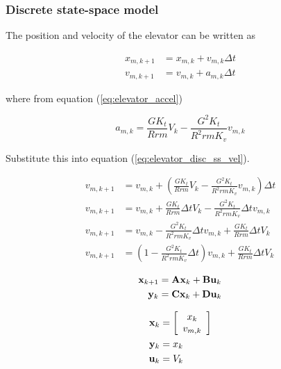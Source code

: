 \subsubsection{Discrete state-space model}

The position and velocity of the elevator can be written as

\begin{align}
  x_{m,k+1} &= x_{m,k} + v_{m,k} \Delta t \label{eq:elevator_disc_ss_pos} \\
  v_{m,k+1} &= v_{m,k} + a_{m,k} \Delta t \label{eq:elevator_disc_ss_vel}
\end{align}

where from equation (\ref{eq:elevator_accel})

\begin{equation*}
  a_{m,k} = \frac{GK_t}{Rrm} V_k - \frac{G^2 K_t}{R^2 rm K_v} v_{m,k}
\end{equation*}

Substitute this into equation (\ref{eq:elevator_disc_ss_vel}).

\begin{align}
  v_{m,k+1} &= v_{m,k} + \left(\frac{GK_t}{Rrm} V_k -
    \frac{G^2 K_t}{R^2 rm K_v} v_{m,k}\right) \Delta t \nonumber \\
  v_{m,k+1} &= v_{m,k} + \frac{GK_t}{Rrm} \Delta t V_k -
    \frac{G^2 K_t}{R^2 rm K_v} \Delta t v_{m,k} \nonumber \\
  v_{m,k+1} &= v_{m,k} - \frac{G^2 K_t}{R^2 rm K_v} \Delta t v_{m,k} +
    \frac{GK_t}{Rrm} \Delta t V_k \nonumber \\
  v_{m,k+1} &= \left(1 - \frac{G^2 K_t}{R^2 rm K_v} \Delta t\right) v_{m,k} +
    \frac{GK_t}{Rrm} \Delta t V_k
\end{align}

\begin{align*}
  \mathbf{x}_{k+1} &= \mathbf{A} \mathbf{x}_k + \mathbf{B} \mathbf{u}_k \\
  \mathbf{y}_k &= \mathbf{C} \mathbf{x}_k + \mathbf{D} \mathbf{u}_k
\end{align*}

\begin{align*}
  \mathbf{x}_k &= \left[
  \begin{array}{c}
    x_k \\
    v_{m,k}
  \end{array}
  \right] \\
  \mathbf{y}_k &= x_k \\
  \mathbf{u}_k &= V_k
\end{align*}

